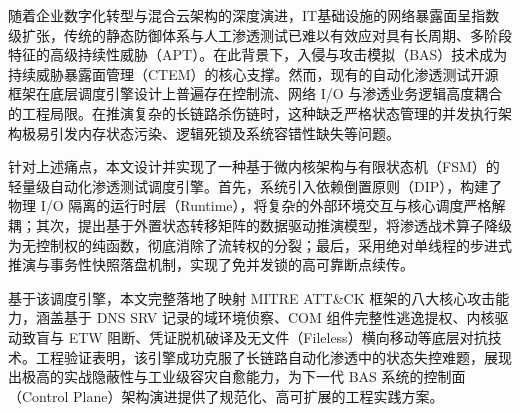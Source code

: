 随着企业数字化转型与混合云架构的深度演进，IT基础设施的网络暴露面呈指数级扩张，传统的静态防御体系与人工渗透测试已难以有效应对具有长周期、多阶段特征的高级持续性威胁（APT）。在此背景下，入侵与攻击模拟（BAS）技术成为持续威胁暴露面管理（CTEM）的核心支撑。然而，现有的自动化渗透测试开源框架在底层调度引擎设计上普遍存在控制流、网络 I/O 与渗透业务逻辑高度耦合的工程局限。在推演复杂的长链路杀伤链时，这种缺乏严格状态管理的并发执行架构极易引发内存状态污染、逻辑死锁及系统容错性缺失等问题。

针对上述痛点，本文设计并实现了一种基于微内核架构与有限状态机（FSM）的轻量级自动化渗透测试调度引擎。首先，系统引入依赖倒置原则（DIP），构建了物理 I/O 隔离的运行时层（Runtime），将复杂的外部环境交互与核心调度严格解耦；其次，提出基于外置状态转移矩阵的数据驱动推演模型，将渗透战术算子降级为无控制权的纯函数，彻底消除了流转权的分裂；最后，采用绝对单线程的步进式推演与事务性快照落盘机制，实现了免并发锁的高可靠断点续传。

基于该调度引擎，本文完整落地了映射 MITRE ATT\&CK 框架的八大核心攻击能力，涵盖基于 DNS SRV 记录的域环境侦察、COM 组件完整性逃逸提权、内核驱动致盲与 ETW 阻断、凭证脱机破译及无文件（Fileless）横向移动等底层对抗技术。工程验证表明，该引擎成功克服了长链路自动化渗透中的状态失控难题，展现出极高的实战隐蔽性与工业级容灾自愈能力，为下一代 BAS 系统的控制面（Control Plane）架构演进提供了规范化、高可扩展的工程实践方案。

